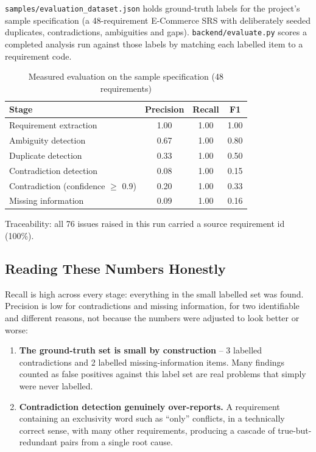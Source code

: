 \documentclass[11pt,a4paper]{article}
\begin{document}
\texttt{samples/evaluation\_dataset.json} holds ground-truth labels for the
project's sample specification (a 48-requirement E-Commerce SRS with
deliberately seeded duplicates, contradictions, ambiguities and gaps).
\texttt{backend/evaluate.py} scores a completed analysis run against those
labels by matching each labelled item to a requirement code.

\begin{table}[h!]
\centering
\begin{tabular}{lccc}
\toprule
\textbf{Stage} & \textbf{Precision} & \textbf{Recall} & \textbf{F1} \\
\midrule
Requirement extraction            & 1.00 & 1.00 & 1.00 \\
Ambiguity detection                & 0.67 & 1.00 & 0.80 \\
Duplicate detection                & 0.33 & 1.00 & 0.50 \\
Contradiction detection            & 0.08 & 1.00 & 0.15 \\
Contradiction (confidence $\geq$ 0.9) & 0.20 & 1.00 & 0.33 \\
Missing information                & 0.09 & 1.00 & 0.16 \\
\bottomrule
\end{tabular}
\caption{Measured evaluation on the sample specification (48 requirements)}
\end{table}

Traceability: all 76 issues raised in this run carried a source requirement
id (100\%).

\subsection{Reading These Numbers Honestly}

Recall is high across every stage: everything in the small labelled set was
found. Precision is low for contradictions and missing information, for two
identifiable and different reasons, not because the numbers were adjusted
to look better or worse:

\begin{enumerate}[leftmargin=1.6em]
  \item \textbf{The ground-truth set is small by construction} -- 3 labelled
        contradictions and 2 labelled missing-information items. Many
        findings counted as false positives against this label set are real
        problems that simply were never labelled.
  \item \textbf{Contradiction detection genuinely over-reports.} A
        requirement containing an exclusivity word such as ``only''
        conflicts, in a technically correct sense, with many other
        requirements, producing a cascade of true-but-redundant pairs from
        a single root cause.
\end{enumerate}
\end{document}
